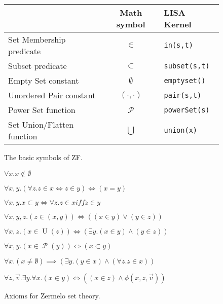 \begin{figure}
\begin{center}
\begin{tabular}{l|c|l}
{} & Math symbol & LISA Kernel\\ \hline
Set Membership predicate & $\in$ & \lstinline$in(s,t)$\\
Subset predicate & $\subset$ & \lstinline$subset(s,t)$ \\
Empty Set constant & $\emptyset$ & \lstinline$emptyset()$ \\
Unordered Pair constant & $(\cdot, \cdot )$ & \lstinline$pair(s,t)$ \\
Power Set function & $\mathcal P$ & \lstinline$powerSet(s)$ \\
Set Union/Flatten function & $\bigcup$ & \lstinline$union(x)$ \\
\end{tabular}

\caption{The basic symbols of ZF.}
\label{fig:symbolszf}
\end{center}
\end{figure}

\begin{figure}
\begin{axz}\label{axz:empty}
$\forall x. x \notin \emptyset$
\end{axz}
\begin{axz}[extensionality]\label{axz:extensionality}
$\forall x, y. (\forall z. z \in x \iff z \in y) \iff (x = y)$
\end{axz}
\begin{axz}[extensionality]\label{axz:subset}
$\forall x, y. x\subset y \iff \forall z. z \in x iff z \in y$
\end{axz}
\begin{axz}[pair]\label{axz:pair}
$\forall x, y, z. (z \in (x, y)) \iff ((x \in y) \lor (y \in z))$
\end{axz}
\begin{axz}[union]\label{axz:union}
$\forall x, z. (x \in \operatorname{U}(z)) \iff (\exists y. (x \in y) \land (y \in z))$
\end{axz}
\begin{axz}[power]\label{axz:power}
$\forall x, y. (x \in \operatorname{\mathcal{P}}(y)) \iff (x \subset y)$
\end{axz}
\begin{axz}[foundation]\label{axz:foundation}
$\forall x. (x \neq \emptyset) \implies (\exists y. (y \in x) \land (\forall z. z \in x))$
\end{axz}
\begin{axz}\label{axz:comprehension}
$\forall z, \vec{v}. \exists y. \forall x. (x \in y) \iff ((x \in z) \land \phi(x, z, \vec{v}))$
\end{axz}
\caption{Axioms for Zermelo set theory.}
\label{fig:axiomsz}
\end{figure}

